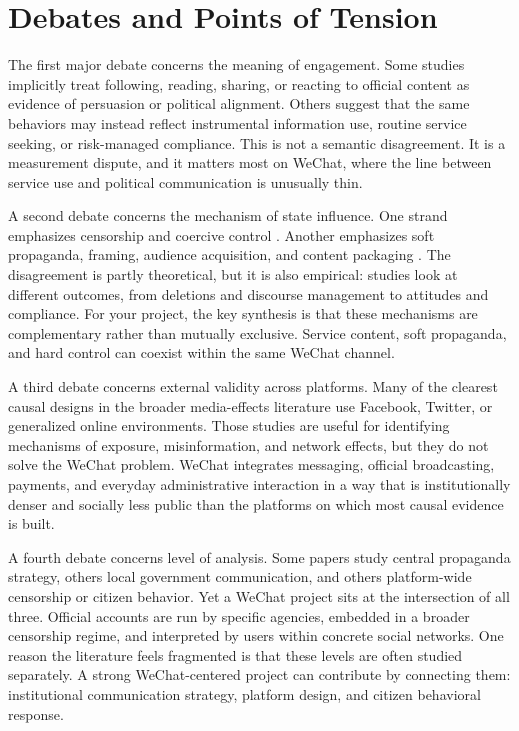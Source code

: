 \documentclass[12pt]{article}
\begin{document}
        \section{Debates and Points of Tension}

        The first major debate concerns the meaning of engagement. Some studies implicitly treat following, reading, sharing, or reacting to official content as evidence of persuasion or political alignment. Others suggest that the same behaviors may instead reflect instrumental information use, routine service seeking, or risk-managed compliance. This is not a semantic disagreement. It is a measurement dispute, and it matters most on WeChat, where the line between service use and political communication is unusually thin.

        A second debate concerns the mechanism of state influence. One strand emphasizes censorship and coercive control \citep{tai_2014_journal_of_east_asian_studies,sun_2022_politics_society}. Another emphasizes soft propaganda, framing, audience acquisition, and content packaging \citep{repnikova_2018_jcc,han_2025_cq,LuPan2021}. The disagreement is partly theoretical, but it is also empirical: studies look at different outcomes, from deletions and discourse management to attitudes and compliance. For your project, the key synthesis is that these mechanisms are complementary rather than mutually exclusive. Service content, soft propaganda, and hard control can coexist within the same WeChat channel.

        A third debate concerns external validity across platforms. Many of the clearest causal designs in the broader media-effects literature use Facebook, Twitter, or generalized online environments. Those studies are useful for identifying mechanisms of exposure, misinformation, and network effects, but they do not solve the WeChat problem. WeChat integrates messaging, official broadcasting, payments, and everyday administrative interaction in a way that is institutionally denser and socially less public than the platforms on which most causal evidence is built.

        A fourth debate concerns level of analysis. Some papers study central propaganda strategy, others local government communication, and others platform-wide censorship or citizen behavior. Yet a WeChat project sits at the intersection of all three. Official accounts are run by specific agencies, embedded in a broader censorship regime, and interpreted by users within concrete social networks. One reason the literature feels fragmented is that these levels are often studied separately. A strong WeChat-centered project can contribute by connecting them: institutional communication strategy, platform design, and citizen behavioral response.
\end{document}
